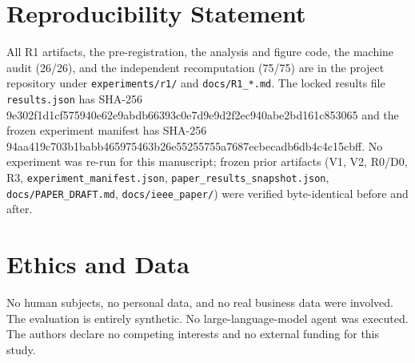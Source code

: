 \documentclass[conference]{IEEEtran}
\newcommand{\code}[1]{\texttt{#1}}
\begin{document}
\section*{Reproducibility Statement}
All R1 artifacts, the pre-registration, the analysis and figure code, the
machine audit (26/26), and the independent recomputation (75/75) are in the
project repository under \code{experiments/r1/} and \code{docs/R1\_*.md}. The
locked results file \code{results.json} has SHA-256
{\footnotesize\ttfamily 9e302f1d1cf575940e62e9abdb66393c0e7d9e9d2f2ec940abe2bd161c853065}
and the frozen experiment manifest has SHA-256
{\footnotesize\ttfamily 94aa419c703b1babb465975463b26e55255755a7687ecbecadb6db4c4c15cbff}.
No experiment was re-run for this manuscript; frozen prior artifacts
(V1, V2, R0/D0, R3, \code{experiment\_manifest.json},
\code{paper\_results\_snapshot.json}, \code{docs/PAPER\_DRAFT.md},
\code{docs/ieee\_paper/}) were verified byte-identical before and after.

\section*{Ethics and Data}
No human subjects, no personal data, and no real business data were involved.
The evaluation is entirely synthetic. No large-language-model agent was
executed. The authors declare no competing interests and no external funding for
this study.



\end{document}
